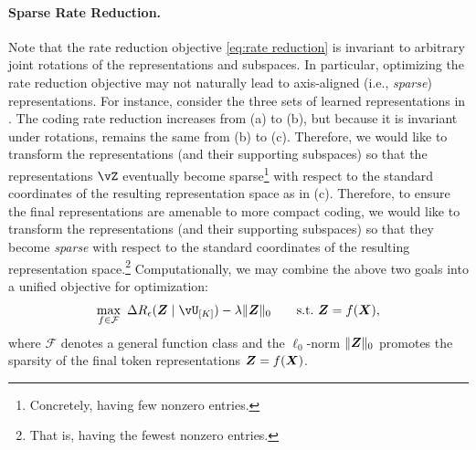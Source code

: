 \documentclass[../../book-main.tex]{subfiles}
\begin{document}
\paragraph{Sparse Rate Reduction.} Note that the rate reduction objective \eqref{eq:rate reduction} is invariant to arbitrary joint rotations of the representations and subspaces. In particular, optimizing the rate reduction objective may not naturally lead to axis-aligned (i.e., \textit{sparse}) representations. {For instance, consider the three sets of learned representations in . The coding rate reduction increases from (a) to (b), but because it is invariant under rotations, remains the same from (b) to (c).} Therefore, we would like to transform the representations (and their supporting subspaces) so that the representations $\vZ$ eventually become sparse\footnote{Concretely, having few nonzero entries.} with respect to the standard coordinates of the resulting representation space {as in (c)}. Therefore, to ensure the final representations are amenable to more compact coding, we would like to transform the representations (and their supporting subspaces) so that they become \textit{sparse} with respect to the standard coordinates of the resulting representation space.\footnote{That is, having the fewest nonzero entries.} Computationally, we may combine the above two goals into a unified objective for optimization:
\begin{equation}
   \max_{f \in \mathcal{F}}\ \Delta R_{\epsilon}(\Z \mid \vU_{[K]}) - \lambda \|\bm{Z}\|_0 \qquad \text{s.t.}\ \Z = f(\X),
   \label{eq:sparse-rr}
\end{equation}
where $\mathcal{F}$ denotes a general function class and the $\ell_0$-norm $\|\bm{Z}\|_0$ promotes the sparsity of the final token representations \(\bm{Z} = f(\bm{X})\).%
\end{document}
